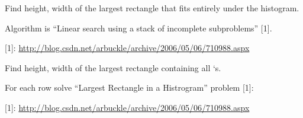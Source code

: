 \documentclass[letterpaper,10pt,english]{sphinxmanual}
\begin{document}
\begin{fulllineitems}
\label{\detokenize{ler:ler.image_ler.max_rectangle_size}}
Find height, width of the largest rectangle that fits entirely under
the histogram.

\begin{sphinxVerbatim}[commandchars=\\\{\}]
  
\PYG{p}{[}\PYG{p}{]}
\PYG{p}{[}\PYG{p}{]}
\PYG{p}{[}\PYG{p}{]}
\PYG{p}{[}\PYG{p}{]}
\PYG{p}{[}\PYG{p}{]}
\PYG{p}{[}\PYG{p}{]}
\end{sphinxVerbatim}

Algorithm is ``Linear search using a stack of incomplete subproblems'' {[}1{]}.

{[}1{]}: \url{http://blog.csdn.net/arbuckle/archive/2006/05/06/710988.aspx}

\end{fulllineitems}


\begin{fulllineitems}
\label{\detokenize{ler:ler.image_ler.max_size}}
Find height, width of the largest rectangle containing all `s.

For each row solve ``Largest Rectangle in a Histrogram'' problem {[}1{]}:

{[}1{]}: \url{http://blog.csdn.net/arbuckle/archive/2006/05/06/710988.aspx}

\end{fulllineitems}
\end{document}
